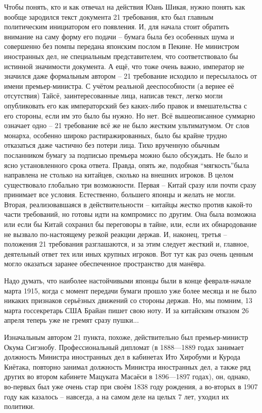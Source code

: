 Чтобы понять, кто и как отвечал на действия Юань Шикая, нужно понять как вообще зародился текст документа 21 требования, кто был главным политическим инициатором его появления. И, для начала стоит обратить внимание на саму форму его подачи – бумага была без особенных шума и совершенно без помпы передана японским послом в Пекине. Не министром иностранных дел, не специальным представителем, что соответствовало бы истинной значимости документа. А ещё, что тоже очень важно, император не значился даже формальным автором – 21 требование исходило и пересылалось от имени премьер-министра. С учётом реальной дееспособности (а вернее её отсутствия) Тайсё, заинтересованные лица, написав текст, легко могли опубликовать его как императорский без каких-либо правок и вмешательства с его стороны, если им это было бы нужно. Но нет. Всё вышеописанное суммарно означает одно – 21 требование всё же не было жестким ультиматумом. От слов монарха, особенно широко растиражированных, было бы крайне трудно отказаться даже частично без потери лица. Тихо врученную обычным посланником бумагу за подписью премьера можно было обсуждать. Не было и ясно установленного срока ответа. Правда, опять же, подобная “мягкость”была направлена не столько на китайцев, сколько на внешних игроков. В целом существовало глобально три возможности. Первая – Китай сразу или почти сразу принимает все условия. Естественно, большего японцы и желать не могли. Вторая, реализовавшаяся в действительности – китайцы жестко против какой-то части требований, но готовы идти на компромисс по другим. Она была возможна или если бы Китай сохранил бы переговоры в тайне, или, если их обнародование не вызвало по-настоящему резкой реакции держав. И, наконец, третья – положения 21 требования разглашаются, и за этим следует жесткий и, главное, деятельный ответ тех или иных крупных игроков. Вот тут как раз очень ценным могло оказаться заранее обеспеченное пространство для манёвра.

Надо думать, что наиболее настойчивыми японцы были в конце февраля-начале марта 1915, когда с момент передачи бумаги прошло уже более месяца и не было никаких признаков серьёзных движений со стороны держав. Но, мы помним, 13 марта госсекретарь США Брайан пишет свою ноту. И за китайским отказом 26 апреля теперь уже не гремят сразу пушки...

Изначальным автором 21 пункта, похоже, действительно был премьер-министр Окума Сигэнобу. Профессиональный дипломат (в 1888—1889 годах занимает должность Министра иностранных дел в кабинетах Ито Хиробуми и Курода Киётака, повторно занимал должность Министра иностранных дел, а также ряд других во втором кабинете Мацуката Масаёси в 1896—1897 годах), он, однако, во-первых был уже очень стар при своём 1838 году рождения, а во-вторых в 1907 году как казалось – навсегда, а на самом деле на целых 7 лет, уходил их политики. 

